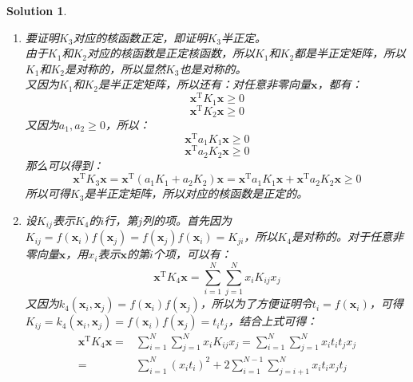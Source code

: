 \documentclass[a4paper,UTF8]{article}
\numberwithin{equation}{section}
\newtheorem*{mySol}{Solution}
\begin{document}
\begin{mySol}
\begin{enumerate}[(1)]
~\\
\item
要证明$K_3$对应的核函数正定，即证明$K_3$半正定。\\
由于$K_1$和$K_2$对应的核函数是正定核函数，所以$K_1$和$K_2$都是半正定矩阵，所以$K_1$和$K_2$是对称的，所以显然$K_3$也是对称的。\\
又因为$K_1$和$K_2$是半正定矩阵，所以还有：对任意非零向量$\mathbf{x}$，都有：\\
\begin{equation}
\mathbf{x}^\mathrm{T}K_1\mathbf{x} \geq 0
\end{equation}
\begin{equation}
\mathbf{x}^\mathrm{T}K_2\mathbf{x} \geq 0
\end{equation}
又因为$a_1,a_2\geq 0$，所以：
\begin{equation}
\mathbf{x}^\mathrm{T}a_1K_1\mathbf{x} \geq 0
\end{equation}
\begin{equation}
\mathbf{x}^\mathrm{T}a_2K_2\mathbf{x} \geq 0
\end{equation}
那么可以得到：
\begin{equation}
\mathbf{x}^\mathrm{T}K_3\mathbf{x} = \mathbf{x}^\mathrm{T}(a_1K_1+a_2K_2)\mathbf{x} = \mathbf{x}^\mathrm{T}a_1K_1\mathbf{x} + \mathbf{x}^\mathrm{T}a_2K_2\mathbf{x} \geq 0
\end{equation}
所以可得$K_3$是半正定矩阵，所以对应的核函数是正定的。
\item 
设$K_{ij}$表示$K_4$的$i$行，第$j$列的项。首先因为$K_{ij}=f(\mathbf{x}_i)f(\mathbf{x}_j)=f(\mathbf{x}_j)f(\mathbf{x}_i)=K_{ji}$，所以$K_4$是对称的。对于任意非零向量$\mathbf{x}$，用$x_i$表示$\mathbf{x}$的第$i$个项，可以有：
\begin{equation}
\mathbf{x}^\mathrm{T}K_4\mathbf{x} = \sum_{i=1}^{N}\sum_{j=1}^{N}x_iK_{ij}x_j
\end{equation}
又因为$k_4(\mathbf{x}_i,\mathbf{x}_j)=f(\mathbf{x}_i)f(\mathbf{x}_j)$，所以为了方便证明令$t_i = f(\mathbf{x}_i)$，可得$K_{ij}=k_4(\mathbf{x}_i,\mathbf{x}_j)=f(\mathbf{x}_i)f(\mathbf{x}_j)=t_it_j$，结合上式可得：
\begin{equation}
\begin{aligned}
\mathbf{x}^\mathrm{T}K_4\mathbf{x} =& \sum_{i=1}^{N}\sum_{j=1}^{N}x_iK_{ij}x_j = \sum_{i=1}^{N}\sum_{j=1}^{N}x_it_it_jx_j\\ 
=& \sum_{i=1}^{N}(x_it_i)^2 + 2\sum_{i=1}^{N-1}\sum_{j=i+1}^{N}x_it_ix_jt_j\\

\end{aligned}
\end{equation}
\end{enumerate}
\end{mySol}
\end{document}
